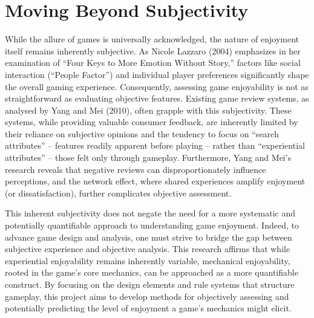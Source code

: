 \section{Moving Beyond Subjectivity}
While the allure of games is universally acknowledged, the nature of enjoyment itself remains inherently subjective. As Nicole Lazzaro (2004) emphasizes in her examination of “Four Keys to More Emotion Without Story,” factors like social interaction (``People Factor'') and individual player preferences significantly shape the overall gaming experience. Consequently, assessing game enjoyability is not as straightforward as evaluating objective features. Existing game review systems, as analysed by Yang and Mei (2010), often grapple with this subjectivity. These systems, while providing valuable consumer feedback, are inherently limited by their reliance on subjective opinions and the tendency to focus on “search attributes” – features readily apparent before playing – rather than “experiential attributes” – those felt only through gameplay. Furthermore, Yang and Mei’s research reveals that negative reviews can disproportionately influence perceptions, and the network effect, where shared experiences amplify enjoyment (or dissatisfaction), further complicates objective assessment.

This inherent subjectivity does not negate the need for a more systematic and potentially quantifiable approach to understanding game enjoyment. Indeed, to advance game design and analysis, one must strive to bridge the gap between subjective experience and objective analysis. This research affirms that while experiential enjoyability remains inherently variable, mechanical enjoyability, rooted in the game's core mechanics, can be approached as a more quantifiable construct. By focusing on the design elements and rule systems that structure gameplay, this project aims to develop methods for objectively assessing and potentially predicting the level of enjoyment a game's mechanics might elicit.

